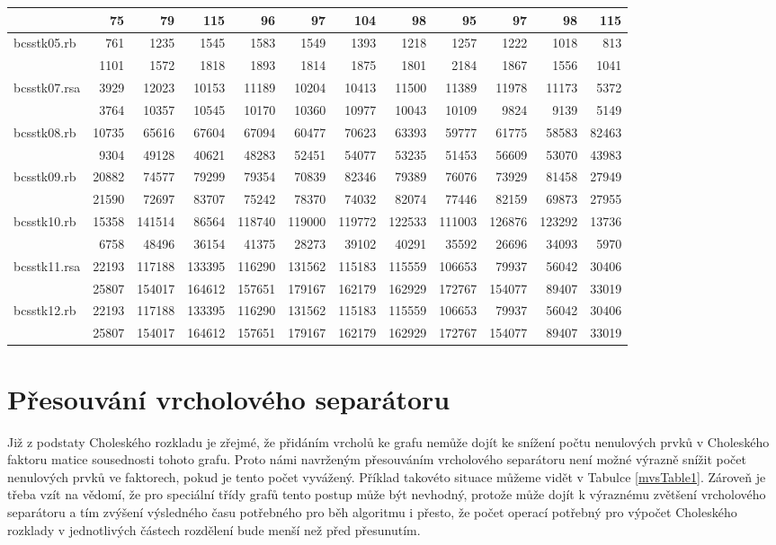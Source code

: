 \documentclass[11pt,american,czech,oneside]{book}
\theoremstyle{plain}
\theoremstyle{definition}
\begin{document}
{\begin{tabular}{|l|rrrrrrrrrrr|}
  &75&79&115&96&97&104&98&95&97&98&115	\\
  \hline
  \multirow{2}{*}{bcsstk05.rb}&761&1235&1545&1583&1549&1393&1218&1257&1222&1018&813	\\
  &1101&1572&1818&1893&1814&1875&1801&2184&1867&1556&1041	\\
  \hline
  \multirow{2}{*}{bcsstk07.rsa}&3929&12023&10153&11189&10204&10413&11500&11389&11978&11173&5372	\\
  &3764&10357&10545&10170&10360&10977&10043&10109&9824&9139&5149	\\
  \hline
  \multirow{2}{*}{bcsstk08.rb}&10735&65616&67604&67094&60477&70623&63393&59777&61775&58583&82463	\\
  &9304&49128&40621&48283&52451&54077&53235&51453&56609&53070&43983	\\
  \hline
  \multirow{2}{*}{bcsstk09.rb}&20882&74577&79299&79354&70839&82346&79389&76076&73929&81458&27949	\\
  &21590&72697&83707&75242&78370&74032&82074&77446&82159&69873&27955	\\
  \hline
  \multirow{2}{*}{bcsstk10.rb}&15358&141514&86564&118740&119000&119772&122533&111003&126876&123292&13736	\\
  &6758&48496&36154&41375&28273&39102&40291&35592&26696&34093&5970	\\
  \hline
  \multirow{2}{*}{bcsstk11.rsa}&22193&117188&133395&116290&131562&115183&115559&106653&79937&56042&30406	\\
  &25807&154017&164612&157651&179167&162179&162929&172767&154077&89407&33019	\\
  \hline
  \multirow{2}{*}{bcsstk12.rb}&22193&117188&133395&116290&131562&115183&115559&106653&79937&56042&30406	\\
  &25807&154017&164612&157651&179167&162179&162929&172767&154077&89407&33019	\\
  \hline
\end{tabular}
}

\section{Přesouvání vrcholového separátoru}

Již z podstaty Choleského rozkladu je zřejmé, že přidáním vrcholů ke grafu nemůže dojít ke snížení počtu nenulových prvků v Choleského faktoru matice sousednosti tohoto grafu. Proto námi navrženým přesouváním vrcholového separátoru není možné výrazně snížit počet nenulových prvků ve faktorech, pokud je tento počet vyvážený. Příklad takovéto situace můžeme vidět v Tabulce \ref{mvsTable1}. Zároveň je třeba vzít na vědomí, že pro speciální třídy grafů tento postup může být nevhodný, protože může dojít k výraznému zvětšení vrcholového separátoru a tím zvýšení výsledného času potřebného pro běh algoritmu i přesto, že počet operací potřebný pro výpočet Choleského rozklady v jednotlivých částech rozdělení bude menší než před přesunutím.
\end{document}
